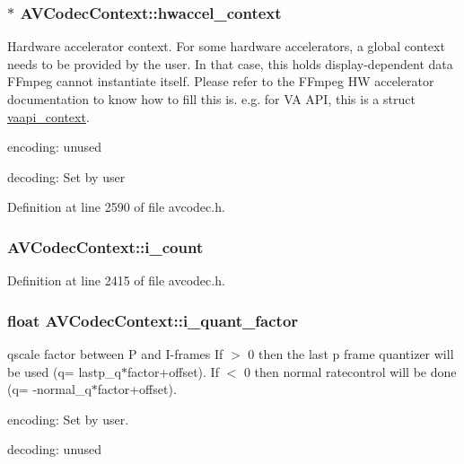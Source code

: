 \subsubsection[{\texorpdfstring{hwaccel\+\_\+context}{hwaccel_context}}]{$\ast$ A\+V\+Codec\+Context\+::hwaccel\+\_\+context}\hypertarget{struct_a_v_codec_context_ab222f7d747dfdceff0a76999e09648c0}{}\label{struct_a_v_codec_context_ab222f7d747dfdceff0a76999e09648c0}
Hardware accelerator context. For some hardware accelerators, a global context needs to be provided by the user. In that case, this holds display-\/dependent data F\+Fmpeg cannot instantiate itself. Please refer to the F\+Fmpeg HW accelerator documentation to know how to fill this is. e.\+g. for VA A\+PI, this is a struct \hyperlink{structvaapi__context}{vaapi\+\_\+context}.
\begin{DoxyItemize}
\item encoding\+: unused
\item decoding\+: Set by user 
\end{DoxyItemize}

Definition at line 2590 of file avcodec.\+h.

\subsubsection[{\texorpdfstring{i\+\_\+count}{i_count}}]{ A\+V\+Codec\+Context\+::i\+\_\+count}\hypertarget{struct_a_v_codec_context_a2f29029c23a73b768eb77b792f6e6547}{}\label{struct_a_v_codec_context_a2f29029c23a73b768eb77b792f6e6547}


Definition at line 2415 of file avcodec.\+h.

\subsubsection[{\texorpdfstring{i\+\_\+quant\+\_\+factor}{i_quant_factor}}]{\setlength{\rightskip}{0pt plus 5cm}float A\+V\+Codec\+Context\+::i\+\_\+quant\+\_\+factor}\hypertarget{struct_a_v_codec_context_aef7017818f06f053f2e63fe759b30eb1}{}\label{struct_a_v_codec_context_aef7017818f06f053f2e63fe759b30eb1}
qscale factor between P and I-\/frames If $>$ 0 then the last p frame quantizer will be used (q= lastp\+\_\+q$\ast$factor+offset). If $<$ 0 then normal ratecontrol will be done (q= -\/normal\+\_\+q$\ast$factor+offset).
\begin{DoxyItemize}
\item encoding\+: Set by user.
\item decoding\+: unused 
\end{DoxyItemize}

